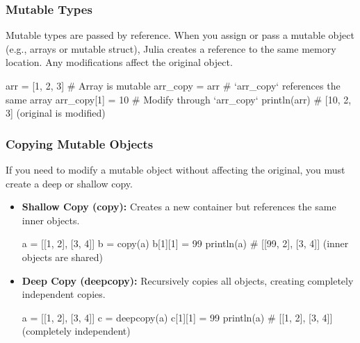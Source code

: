 \documentclass{report}
\begin{document}
     \bigbreak \noindent 
     \subsubsection{Mutable Types}
     \bigbreak \noindent 
     Mutable types are passed by reference.
     When you assign or pass a mutable object (e.g., arrays or mutable struct), Julia creates a reference to the same memory location. Any modifications affect the original object.
     \bigbreak \noindent 
     \begin{jlcode}
         arr = [1, 2, 3]  # Array is mutable
         arr_copy = arr    # `arr_copy` references the same array
         arr_copy[1] = 10  # Modify through `arr_copy`
         println(arr)      # [10, 2, 3] (original is modified)
     \end{jlcode}

     \bigbreak \noindent 
     \subsubsection{Copying Mutable Objects}
     \bigbreak \noindent 
     If you need to modify a mutable object without affecting the original, you must create a deep or shallow copy.
     \begin{itemize}
         \item \textbf{Shallow Copy (copy):} Creates a new container but references the same inner objects.
             \bigbreak \noindent 
             \begin{jlcode}
                 a = [[1, 2], [3, 4]]
                 b = copy(a)
                 b[1][1] = 99
                 println(a)  # [[99, 2], [3, 4]] (inner objects are shared)
             \end{jlcode}
         \item \textbf{Deep Copy (deepcopy):} Recursively copies all objects, creating completely independent copies.
             \bigbreak \noindent 
             \begin{jlcode}
                 a = [[1, 2], [3, 4]]
                 c = deepcopy(a)
                 c[1][1] = 99
                 println(a)  # [[1, 2], [3, 4]] (completely independent)
             \end{jlcode}
     \end{itemize}

     \bigbreak \noindent 
\end{document}
